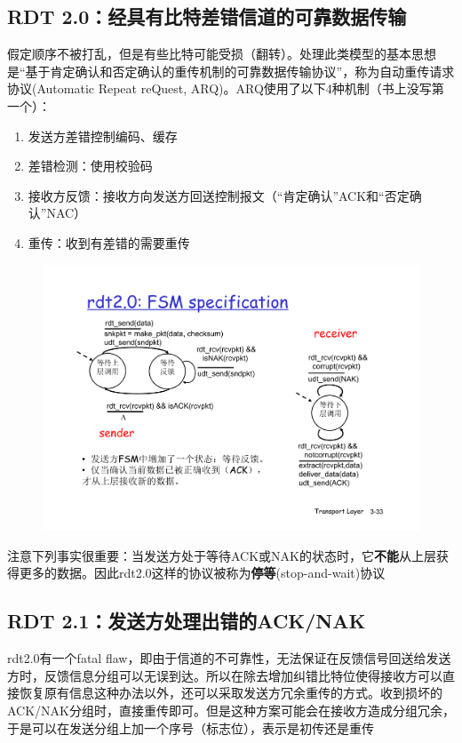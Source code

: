 \documentclass[]{report}
\begin{document}
		\subsection{RDT 2.0：经具有比特差错信道的可靠数据传输}
			假定顺序不被打乱，但是有些比特可能受损（翻转）。处理此类模型的基本思想是“基于肯定确认和否定确认的重传机制的可靠数据传输协议”，称为自动重传请求协议(Automatic Repeat reQuest, ARQ)。ARQ使用了以下4种机制（书上没写第一个）：
			\begin{enumerate}
				\item 发送方差错控制编码、缓存
				\item 差错检测：使用校验码
				\item 接收方反馈：接收方向发送方回送控制报文（“肯定确认”ACK和“否定确认”NAC）
				\item 重传：收到有差错的需要重传
			\end{enumerate}
			\begin{figure}[h!]
				\centering
				\begin{minipage}{40em}
					\centering
					\includegraphics[scale = 0.4]{images/RDT_2_0.pdf}
				\end{minipage}
			\end{figure}
			注意下列事实很重要：当发送方处于等待ACK或NAK的状态时，它\textbf{不能}从上层获得更多的数据。因此rdt2.0这样的协议被称为\textbf{停等}(stop-and-wait)协议
		\subsection{RDT 2.1：发送方处理出错的ACK/NAK}
			rdt2.0有一个fatal flaw，即由于信道的不可靠性，无法保证在反馈信号回送给发送方时，反馈信息分组可以无误到达。所以在除去增加纠错比特位使得接收方可以直接恢复原有信息这种办法以外，还可以采取发送方冗余重传的方式。收到损坏的ACK/NAK分组时，直接重传即可。但是这种方案可能会在接收方造成分组冗余，于是可以在发送分组上加一个序号（标志位），表示是初传还是重传
\end{document}
